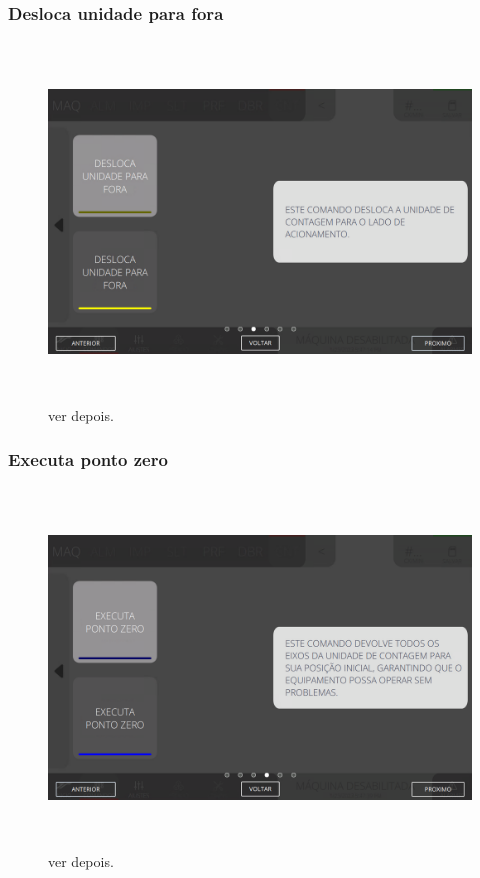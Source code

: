\newpage
\thispagestyle{fancy}
\vspace*{\fill}
\subsubsection{\small{Desloca unidade para fora}}
\begin{figure}[h]
  \centering
  \includegraphics[width=576px,height=360px]{src/imagesFlexo/08-count/commands/e-10.png}
  \caption{ver depois.}
   \label{}
\end{figure}
\vspace*{\fill}

\newpage
\thispagestyle{fancy}
\vspace*{\fill}
\subsubsection{\small{Executa ponto zero}}
\begin{figure}[h]
  \centering
  \includegraphics[width=576px,height=360px]{src/imagesFlexo/08-count/commands/e-11.png}
  \caption{ver depois.}
   \label{}
\end{figure}
\vspace*{\fill}

